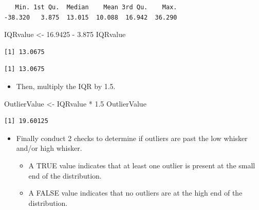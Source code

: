 \documentclass[
  letterpaper,
  DIV=11,
  numbers=noendperiod]{scrreprt}
\newenvironment{Shaded}{\begin{snugshade}}{\end{snugshade}}
\newcommand{\FloatTok}[1]{\textcolor[rgb]{0.68,0.00,0.00}{#1}}
\newcommand{\FunctionTok}[1]{\textcolor[rgb]{0.28,0.35,0.67}{#1}}
\newcommand{\NormalTok}[1]{\textcolor[rgb]{0.00,0.23,0.31}{#1}}
\newcommand{\OtherTok}[1]{\textcolor[rgb]{0.00,0.23,0.31}{#1}}
\newcommand{\SpecialCharTok}[1]{\textcolor[rgb]{0.37,0.37,0.37}{#1}}
\providecommand{\tightlist}{%
  \setlength{\itemsep}{0pt}\setlength{\parskip}{0pt}}\usepackage{longtable,booktabs,array}
\begin{document}
\begin{verbatim}
   Min. 1st Qu.  Median    Mean 3rd Qu.    Max. 
-38.320   3.875  13.015  10.088  16.942  36.290 
\end{verbatim}

\begin{Shaded}
\begin{Highlighting}[]
\NormalTok{IQRvalue }\OtherTok{\textless{}{-}} \FloatTok{16.9425} \SpecialCharTok{{-}} \FloatTok{3.875}
\NormalTok{IQRvalue}
\end{Highlighting}
\end{Shaded}

\begin{verbatim}
[1] 13.0675
\end{verbatim}

\begin{Shaded}
\end{Shaded}

\begin{verbatim}
[1] 13.0675
\end{verbatim}

\begin{itemize}
\tightlist
\item
  Then, multiply the IQR by 1.5.
\end{itemize}

\begin{Shaded}
\begin{Highlighting}[]
\NormalTok{OutlierValue }\OtherTok{\textless{}{-}}\NormalTok{ IQRvalue }\SpecialCharTok{*} \FloatTok{1.5}
\NormalTok{OutlierValue}
\end{Highlighting}
\end{Shaded}

\begin{verbatim}
[1] 19.60125
\end{verbatim}

\begin{itemize}
\tightlist
\item
  Finally conduct 2 checks to determine if outliers are past the low
  whisker and/or high whisker.

  \begin{itemize}
  \tightlist
  \item
    A TRUE value indicates that at least one outlier is present at the
    small end of the distribution.
  \item
    A FALSE value indicates that no outliers are at the high end of the
    distribution.
  \end{itemize}
\end{itemize}
\end{document}
